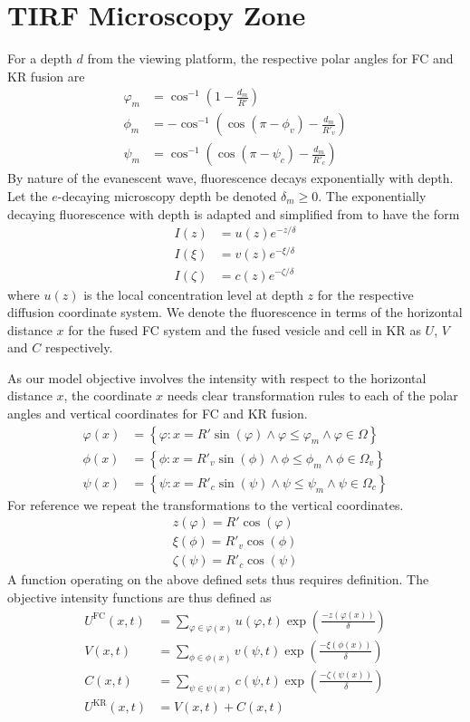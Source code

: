 \documentclass{report}
\newcommand\Par[1]{{ \left({#1}\right) }}
\newcommand\Brace[1]{{ \left\{{#1}\right\} }}
\newcommand\R{{ R' }}
\newcommand\Rc{{ R'_c }}
\newcommand\Rv{{ R'_v }}
\newcommand\FC{{ \text{FC} }}
\newcommand\KR{{ \text{KR} }}
\newcommand{\ze}{{ \zeta }}
\begin{document}
\section{TIRF Microscopy Zone}
For a depth $d$ from the viewing platform, the respective polar angles for FC and KR fusion are
\begin{align*}
	\varphi_m &= \cos^{-1}\Par{1 - \frac{d_m}{\R}} \\
	\phi_m &= -\cos^{-1}\Par{\cos\Par{\pi - \phi_v} - \frac{d_m}{\Rv}} \\
	\psi_m &= \cos^{-1}\Par{\cos(\pi - \psi_c) - \frac{d_m}{\Rc}}
\end{align*}
By nature of the evanescent wave, fluorescence decays exponentially with depth. Let the $e$-decaying microscopy depth be denoted $\delta_m \geq 0$. The exponentially decaying fluorescence with depth is adapted and simplified from \cite{oheim2019calibrating} to have the form
\begin{align*}
	I(z) &= u(z) e^{-z/\delta} \\
	I(\xi) &= v(z) e^{-\xi/\delta} \\
	I(\ze) &= c(z) e^{-\ze/\delta}
\end{align*}
where $u(z)$ is the local concentration level at depth $z$ for the respective diffusion coordinate system. We denote the fluorescence in terms of the horizontal distance $x$ for the fused FC system and the fused vesicle and cell in KR as $U$, $V$ and $C$ respectively.

As our model objective involves the intensity with respect to the horizontal distance $x$, the coordinate $x$ needs clear transformation rules to each of the polar angles and vertical coordinates for FC and KR fusion.
\begin{align*}
	\varphi(x) &= \Brace{
		\varphi
		: x = \R \sin(\varphi)
		\land \varphi \leq \varphi_m
		\land \varphi \in \Omega
	} \\
	\phi(x) &= \Brace{
		\phi
		: x = \Rv \sin(\phi)
		\land \phi \leq \phi_m
		\land \phi \in \Omega_v
	} \\
	\psi(x) &= \Brace{
		\psi
		: x = \Rc \sin(\psi)
		\land \psi \leq \psi_m
		\land \psi \in \Omega_c
	}
\end{align*}
For reference we repeat the transformations to the vertical coordinates.
\begin{align*}
	z(\varphi) = \R \cos(\varphi) \\
	\xi(\phi) = \Rv \cos(\phi) \\
	\ze(\psi) = \Rc \cos(\psi)
\end{align*}
A function operating on the above defined sets thus requires definition. The objective intensity functions are thus defined as
\begin{align*}
	U^\FC(x, t) &= \sum_{\varphi \in \varphi(x)} u(\varphi, t) \exp\Par{\frac{-z(\varphi(x))}{\delta}} \\
	V(x, t) &= \sum_{\phi \in \phi(x)} v(\psi, t) \exp\Par{\frac{-\xi(\phi(x))}{\delta}} \\
	C(x, t) &= \sum_{\psi \in \psi(x)} c(\psi, t) \exp\Par{\frac{-\ze(\psi(x))}{\delta}} \\
	U^\KR(x, t) &= V(x, t) + C(x, t)
\end{align*}
\end{document}
